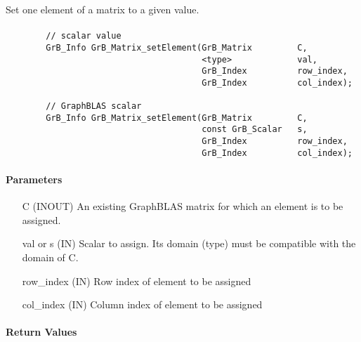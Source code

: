 Set one element of a matrix to a given value.

\paragraph{\syntax}

\begin{verbatim}
        // scalar value
        GrB_Info GrB_Matrix_setElement(GrB_Matrix         C,
                                       <type>             val,
                                       GrB_Index          row_index,
                                       GrB_Index          col_index); 

        // GraphBLAS scalar
        GrB_Info GrB_Matrix_setElement(GrB_Matrix         C,
                                       const GrB_Scalar   s,
                                       GrB_Index          row_index,
                                       GrB_Index          col_index); 
\end{verbatim}

\paragraph{Parameters}

\begin{itemize}[leftmargin=1.1in]
    \item[{\sf C}]   ({\sf INOUT}) An existing GraphBLAS matrix for which an 
    element is to be assigned.

    \item[{\sf val} or {\sf s}]   ({\sf IN})  Scalar to assign.  Its domain (type) must
    be compatible with the domain of {\sf C}.
    
    \item[{\sf row\_index}] ({\sf IN}) Row index of element to be assigned
    \item[{\sf col\_index}] ({\sf IN}) Column index of element to be assigned
\end{itemize}

\paragraph{Return Values}

